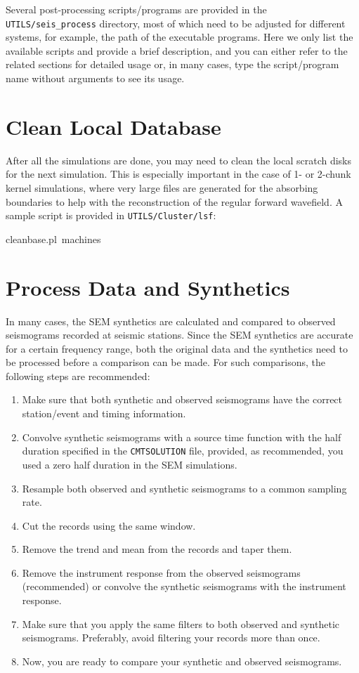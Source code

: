 \documentclass[oneside,english]{book}
\newenvironment{lyxcode}
{\begin{list}{}{
\setlength{\rightmargin}{\leftmargin}
\setlength{\listparindent}{0pt}%
\raggedright
\setlength{\itemsep}{0pt}
\setlength{\parsep}{0pt}
\normalfont\ttfamily}%
 \item[]}
{\end{list}}
\begin{document}
Several post-processing scripts/programs are provided in the \texttt{UTILS/seis\_process}
directory, most of which need to be adjusted for different
systems, for example, the path of the executable programs. Here we
only list the available scripts and provide a brief description, and
you can either refer to the related sections for detailed usage or,
in many cases, type the script/program name without arguments
to see its usage.


\section{Clean Local Database}

After all the simulations are done, you may need to clean the local
scratch disks for the next simulation. This is especially important
in the case of 1- or 2-chunk kernel simulations, where very large files
are generated for the absorbing boundaries to help with the reconstruction
of the regular forward wavefield. A sample script is provided in \texttt{UTILS/Cluster/lsf}:

\begin{lyxcode}
cleanbase.pl~machines
\end{lyxcode}

\section{Process Data and Synthetics\label{sec:Process-data-and-syn}}

In many cases, the SEM synthetics are calculated and compared to observed
seismograms recorded at seismic stations. Since the SEM synthetics
are accurate for a certain frequency range, both the original data
and the synthetics need to be processed before a comparison can be
made. For such comparisons, the following steps are recommended:

\begin{enumerate}
\item Make sure that both synthetic and observed seismograms have the correct station/event and timing information.
\item Convolve synthetic seismograms with a source time function with the half duration specified in the \texttt{CMTSOLUTION} file, provided, as recommended, you used a zero half duration in the SEM simulations.
\item Resample both observed and synthetic seismograms to a common sampling rate.
\item Cut the records using the same window.
\item Remove the trend and mean from the records and taper them.
\item Remove the instrument response from the observed seismograms (recommended) or convolve the synthetic seismograms with the instrument response.
\item Make sure that you apply the same filters to both observed and synthetic seismograms. Preferably, avoid filtering your records more than once.
\item Now, you are ready to compare your synthetic and observed seismograms.
\end{enumerate}
\end{document}
